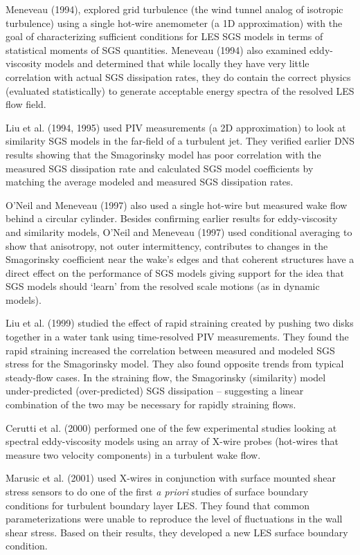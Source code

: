 \documentclass[11pt]{article}
\begin{document}
Meneveau (1994), explored grid turbulence (the wind tunnel analog of isotropic turbulence) using a single hot-wire anemometer (a 1D approximation) with the goal of characterizing sufficient conditions for LES SGS models in terms of statistical moments of SGS quantities.  Meneveau (1994) also examined eddy-viscosity models and determined that while locally they have very little correlation with actual SGS dissipation rates, they do contain the correct physics (evaluated statistically) to generate acceptable energy spectra of the resolved LES flow field. 

Liu et al. (1994, 1995) used PIV measurements (a 2D approximation) to look at similarity SGS models in the far-field of a turbulent jet.  They verified earlier DNS results showing that the Smagorinsky model has poor correlation with the measured SGS dissipation rate and calculated SGS model coefficients by matching the average modeled and measured SGS dissipation rates.  

O'Neil and Meneveau (1997) also used a single hot-wire but measured wake flow behind a circular cylinder.  Besides confirming earlier results for eddy-viscosity and similarity models, O'Neil and Meneveau (1997) used conditional averaging to show that anisotropy, not outer intermittency, contributes to changes in the Smagorinsky coefficient near the wake's edges and that coherent structures have a direct effect on the performance of SGS models giving support for the idea that SGS models should `learn' from the resolved scale motions (as in dynamic models). 

Liu et al. (1999) studied the effect of rapid straining created by pushing two disks together in a water tank using time-resolved PIV measurements. They found the rapid straining increased the correlation between measured and modeled SGS stress for the Smagorinsky model.  They also found opposite trends from typical steady-flow cases. In the straining flow, the Smagorinsky (similarity) model under-predicted (over-predicted) SGS dissipation -- suggesting a linear combination of the two may be necessary for rapidly straining flows.  

Cerutti et al. (2000) performed one of the few experimental studies looking at spectral eddy-viscosity models using an array of X-wire probes (hot-wires that measure two velocity components) in a turbulent wake flow.  

Marusic et al. (2001) used X-wires in conjunction with surface mounted shear stress sensors to do one of the first {\it a priori} studies of surface boundary conditions for turbulent boundary layer LES.  They found that common parameterizations were unable to reproduce the level of fluctuations in the wall shear stress. Based on their results, they developed a new LES surface boundary condition.  
\end{document}
